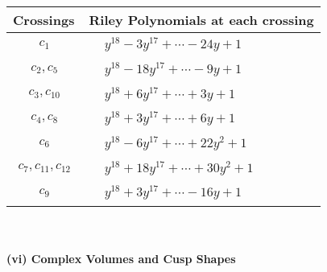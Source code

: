 \documentclass[1p]{elsarticle_modified}
\theoremstyle{definition}
\begin{document}
\begin{tabular}{m{50pt}|m{274pt}}
Crossings & \hspace{64pt}Riley Polynomials at each crossing \\
\hline $$\begin{aligned}c_{1}\end{aligned}$$&$\begin{aligned}
&y^{18}-3 y^{17}+\cdots-24 y+1
\end{aligned}$\\
\hline $$\begin{aligned}c_{2},c_{5}\end{aligned}$$&$\begin{aligned}
&y^{18}-18 y^{17}+\cdots-9 y+1
\end{aligned}$\\
\hline $$\begin{aligned}c_{3},c_{10}\end{aligned}$$&$\begin{aligned}
&y^{18}+6 y^{17}+\cdots+3 y+1
\end{aligned}$\\
\hline $$\begin{aligned}c_{4},c_{8}\end{aligned}$$&$\begin{aligned}
&y^{18}+3 y^{17}+\cdots+6 y+1
\end{aligned}$\\
\hline $$\begin{aligned}c_{6}\end{aligned}$$&$\begin{aligned}
&y^{18}-6 y^{17}+\cdots+22 y^2+1
\end{aligned}$\\
\hline $$\begin{aligned}c_{7},c_{11},c_{12}\end{aligned}$$&$\begin{aligned}
&y^{18}+18 y^{17}+\cdots+30 y^2+1
\end{aligned}$\\
\hline $$\begin{aligned}c_{9}\end{aligned}$$&$\begin{aligned}
&y^{18}+3 y^{17}+\cdots-16 y+1
\end{aligned}$\\
\hline
\end{tabular}\\~\\
\newpage\flushleft \textbf{(vi) Complex Volumes and Cusp Shapes}
\end{document}

